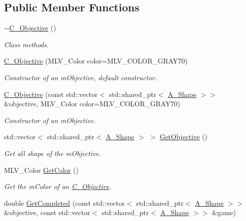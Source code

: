 \subsection*{Public Member Functions}
\begin{DoxyCompactItemize}
\item 
\hyperlink{classC__Objective_a4e05cb06acbee6d49734e2696cd419e9}{$\sim$\+C\+\_\+\+Objective} ()
\begin{DoxyCompactList}\small\item\em Class methods. \end{DoxyCompactList}\item 
\hyperlink{classC__Objective_aedbb7d27ece1f7894285398ae79ea588}{C\+\_\+\+Objective} (M\+L\+V\+\_\+\+Color color=M\+L\+V\+\_\+\+C\+O\+L\+O\+R\+\_\+\+G\+R\+A\+Y70)
\begin{DoxyCompactList}\small\item\em Constructor of an m\+Objective, default constructor. \end{DoxyCompactList}\item 
\hyperlink{classC__Objective_ae92eb6210a460fa7b551651584790ac8}{C\+\_\+\+Objective} (const std\+::vector$<$ std\+::shared\+\_\+ptr$<$ \hyperlink{classA__Shape}{A\+\_\+\+Shape} $>$$>$ \&objective, M\+L\+V\+\_\+\+Color color=M\+L\+V\+\_\+\+C\+O\+L\+O\+R\+\_\+\+G\+R\+A\+Y70)
\begin{DoxyCompactList}\small\item\em Constructor of an m\+Objective. \end{DoxyCompactList}\item 
std\+::vector$<$ std\+::shared\+\_\+ptr$<$ \hyperlink{classA__Shape}{A\+\_\+\+Shape} $>$ $>$ \hyperlink{classC__Objective_aa8e3dea19bd4578246b183d2bad2d475}{Get\+Objective} ()
\begin{DoxyCompactList}\small\item\em Get all shape of the m\+Objective. \end{DoxyCompactList}\item 
M\+L\+V\+\_\+\+Color \hyperlink{classC__Objective_aeaaa69ca15b1e1d8edbc3f1920399964}{Get\+Color} ()
\begin{DoxyCompactList}\small\item\em Get the m\+Color of an \hyperlink{classC__Objective}{C\+\_\+\+Objective}. \end{DoxyCompactList}\item 
double \hyperlink{classC__Objective_a026149982f0d62ea0a039a8b94bbaae0}{Get\+Completed} (const std\+::vector$<$ std\+::shared\+\_\+ptr$<$ \hyperlink{classA__Shape}{A\+\_\+\+Shape} $>$$>$ \&objective, const std\+::vector$<$ std\+::shared\+\_\+ptr$<$ \hyperlink{classA__Shape}{A\+\_\+\+Shape} $>$$>$ \&game)
$$
\end{DoxyCompactItemize}
